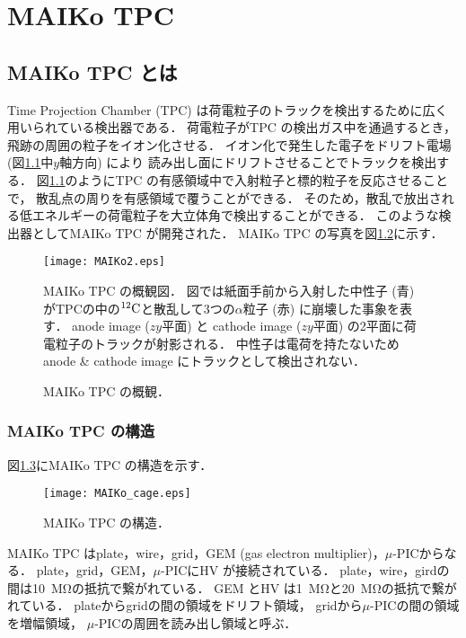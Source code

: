 \documentclass[../master]{subfiles}
\begin{document}
\chapter{MAIKo TPC}
\section{MAIKo TPC とは}
Time Projection Chamber (TPC) は荷電粒子のトラックを検出するために広く用いられている検出器である．
荷電粒子がTPC の検出ガス中を通過するとき，飛跡の周囲の粒子をイオン化させる．
イオン化で発生した電子をドリフト電場 (図\ref{fig::MAIKo_view}中$y$軸方向) により
読み出し面にドリフトさせることでトラックを検出する．
図\ref{fig::MAIKo_view}のようにTPC の有感領域中で入射粒子と標的粒子を反応させることで，
散乱点の周りを有感領域で覆うことができる．
そのため，散乱で放出される低エネルギーの荷電粒子を大立体角で検出することができる．
このような検出器としてMAIKo TPC が開発された．
MAIKo TPC の写真を図\ref{pic::MAIKo}に示す．
\begin{figure}
  \centering
  \texttt{[image: MAIKo2.eps]}
  \caption[MAIKo TPC の概観図．]{MAIKo TPC の概観図．
    図では紙面手前から入射した中性子 (青) がTPCの中の${}^{12}{\rm C}$と散乱して3つの$\alpha$粒子 (赤) に崩壊した事象を表す．
    anode image ($zy$平面) と cathode image ($zy$平面) の2平面に荷電粒子のトラックが射影される．
    中性子は電荷を持たないためanode \& cathode image にトラックとして検出されない．
  }
  \label{fig::MAIKo_view}
\end{figure}
\begin{figure}
  \centering
  \caption[MAIKo TPC の概観．]{MAIKo TPC の概観．}
  \label{pic::MAIKo}
\end{figure}

\subsection{MAIKo TPC の構造}
\label{sec::maiko-cage}
図\ref{fig::MAIKo_cage}にMAIKo TPC の構造を示す．
\begin{figure}
  \centering
  \texttt{[image: MAIKo\_cage.eps]}
  \caption{MAIKo TPC の構造．}
  \label{fig::MAIKo_cage}
\end{figure}
MAIKo TPC はplate，wire，grid，GEM (gas electron multiplier)，$\mu$-PICからなる．
plate，grid，GEM，$\mu$-PICにHV が接続されている．
plate，wire，girdの間は\SI{10}{\mega\ohm}の抵抗で繋がれている．
GEM とHV は\SI{1}{\mega\ohm}と\SI{20}{\mega\ohm}の抵抗で繋がれている．
plateからgridの間の領域をドリフト領域，
gridから$\mu$-PICの間の領域を増幅領域，
$\mu$-PICの周囲を読み出し領域と呼ぶ．
\end{document}
